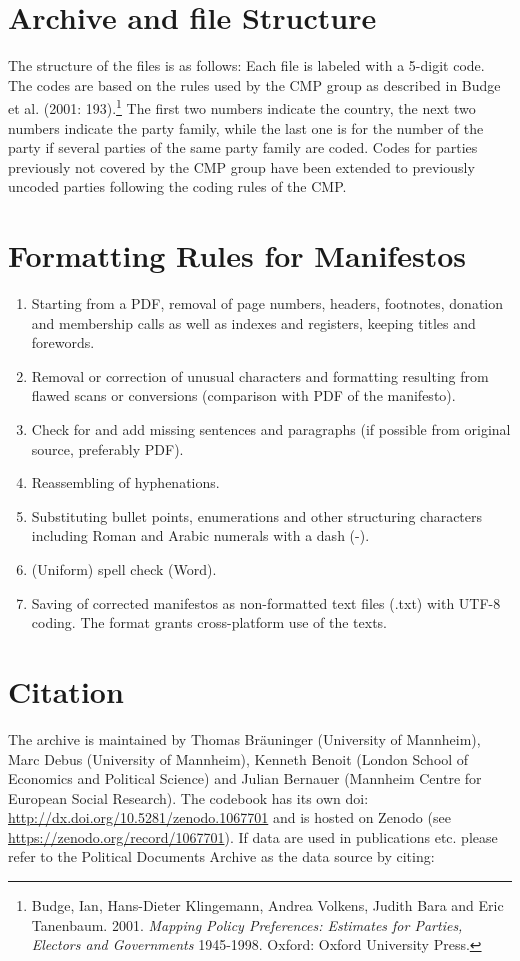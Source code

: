 \documentclass[a4paper, 12pt]{article}
\begin{document}

\section{Archive and file Structure }
The structure of the files is as follows: Each file is labeled with a 5-digit code. The codes are based on the rules used by the CMP group as described in Budge et al. (2001: 193).\footnote{Budge, Ian, Hans-Dieter Klingemann, Andrea Volkens, Judith Bara and Eric Tanenbaum. 2001. \textit{Mapping Policy Preferences: Estimates for Parties, Electors and Governments} 1945-1998. Oxford: Oxford University Press.} The first two numbers indicate the country, the next two numbers indicate the party family, while the last one is for the number of the party if several parties of the same party family are coded. Codes for parties previously not covered by the CMP group have been extended to previously uncoded parties following the coding rules of the CMP. 


\section{Formatting Rules for Manifestos}

\begin{enumerate}
\item Starting from a PDF, removal of page numbers, headers, footnotes, donation and membership calls as well as indexes and registers, keeping titles and forewords. 
\item Removal or correction of unusual characters and formatting resulting from flawed scans or conversions (comparison with PDF of the manifesto).
\item Check for and add missing sentences and paragraphs (if possible from original source, preferably PDF).
\item Reassembling of hyphenations.
\item Substituting bullet points, enumerations and other structuring characters including Roman and Arabic numerals with a dash (-).
\item (Uniform) spell check (Word).
\item Saving of corrected manifestos as non-formatted text files (.txt) with UTF-8 coding. The format grants cross-platform use of the texts.
\end{enumerate}

\newpage

\section{Citation}
The archive is maintained by Thomas Bräuninger (University of Mannheim), Marc Debus (University of Mannheim), Kenneth Benoit (London School of Economics and Political Science) and Julian Bernauer (Mannheim Centre for European Social Research). 
The codebook has its own doi: \url{http://dx.doi.org/10.5281/zenodo.1067701} and is hosted on Zenodo (see \url{https://zenodo.org/record/1067701}). 
If data are used in publications etc. please refer to the Political Documents Archive as the data source by citing:
\end{document}
